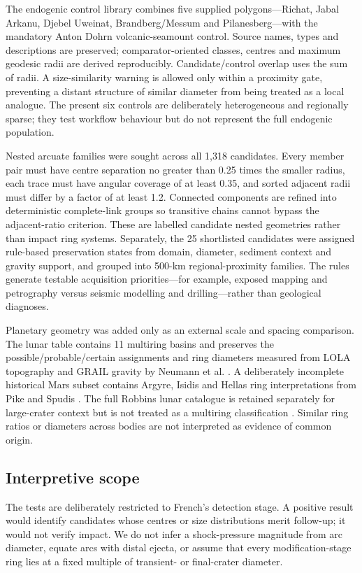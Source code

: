 \documentclass[11pt]{article}
\begin{document}
The endogenic control library combines five supplied polygons---Richat, Jabal Arkanu, Djebel Uweinat, Brandberg/Messum and Pilanesberg---with the mandatory Anton Dohrn volcanic-seamount control. Source names, types and descriptions are preserved; comparator-oriented classes, centres and maximum geodesic radii are derived reproducibly. Candidate/control overlap uses the sum of radii. A size-similarity warning is allowed only within a proximity gate, preventing a distant structure of similar diameter from being treated as a local analogue. The present six controls are deliberately heterogeneous and regionally sparse; they test workflow behaviour but do not represent the full endogenic population.

Nested arcuate families were sought across all 1,318 candidates. Every member pair must have centre separation no greater than 0.25 times the smaller radius, each trace must have angular coverage of at least 0.35, and sorted adjacent radii must differ by a factor of at least 1.2. Connected components are refined into deterministic complete-link groups so transitive chains cannot bypass the adjacent-ratio criterion. These are labelled candidate nested geometries rather than impact ring systems. Separately, the 25 shortlisted candidates were assigned rule-based preservation states from domain, diameter, sediment context and gravity support, and grouped into 500-km regional-proximity families. The rules generate testable acquisition priorities---for example, exposed mapping and petrography versus seismic modelling and drilling---rather than geological diagnoses.

Planetary geometry was added only as an external scale and spacing comparison. The lunar table contains 11 multiring basins and preserves the possible/probable/certain assignments and ring diameters measured from LOLA topography and GRAIL gravity by Neumann et al. \cite{Neumann2015}. A deliberately incomplete historical Mars subset contains Argyre, Isidis and Hellas ring interpretations from Pike and Spudis \cite{PikeSpudis1987}. The full Robbins lunar catalogue is retained separately for large-crater context but is not treated as a multiring classification \cite{Robbins2019}. Similar ring ratios or diameters across bodies are not interpreted as evidence of common origin.

\subsection{Interpretive scope}
The tests are deliberately restricted to French's detection stage. A positive result would identify candidates whose centres or size distributions merit follow-up; it would not verify impact. We do not infer a shock-pressure magnitude from arc diameter, equate arcs with distal ejecta, or assume that every modification-stage ring lies at a fixed multiple of transient- or final-crater diameter.
\end{document}
